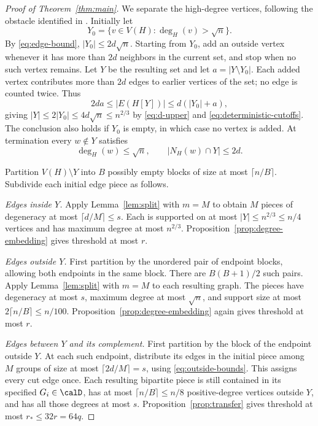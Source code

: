 \begin{proof}[Proof of Theorem~\ref{thm:main}]
We separate the high-degree vertices, following the obstacle
identified in \cite[Section~8]{AHPT26}. Initially let
\[
 Y_0=\{v\in V(H):\deg_H(v)>\sqrt n\}.
\]
By \eqref{eq:edge-bound}, $|Y_0|\leq2d\sqrt n$.
Starting from $Y_0$, add an outside vertex whenever it has more
than $2d$ neighbors in the current set, and stop when no such
vertex remains. Let $Y$ be the resulting set and let
$a=|Y\setminus Y_0|$. Each added vertex contributes more than
$2d$ edges to earlier vertices of the set; no edge is counted
twice. Thus
\[
 2da\leq|E(H[Y])|\leq d(|Y_0|+a),
\]
giving $|Y|\leq2|Y_0|\leq4d\sqrt n\leq n^{2/3}$ by
\eqref{eq:d-upper} and \eqref{eq:deterministic-cutoffs}.
The conclusion also holds if $Y_0$ is empty, in which case no
vertex is added. At termination every $w\notin Y$ satisfies
\begin{equation}\label{eq:outside-bounds}
 \deg_H(w)\leq\sqrt n,\qquad |N_H(w)\cap Y|\leq2d.
\end{equation}

Partition $V(H)\setminus Y$ into $B$ possibly empty blocks
of size at most $\lceil n/B\rceil$. Subdivide each initial
edge piece as follows.

\emph{Edges inside $Y$.}
Apply Lemma~\ref{lem:split} with $m=M$ to obtain $M$ pieces
of degeneracy at most $\lceil d/M\rceil\leq s$.
Each is supported on at most $|Y|\leq n^{2/3}\leq n/4$
vertices and has maximum degree at most $n^{2/3}$.
Proposition~\ref{prop:degree-embedding} gives threshold at most $r$.

\emph{Edges outside $Y$.}
First partition by the unordered pair of endpoint blocks,
allowing both endpoints in the same block. There are
$B(B+1)/2$ such pairs. Apply Lemma~\ref{lem:split} with
$m=M$ to each resulting graph. The pieces have degeneracy
at most $s$, maximum degree at most $\sqrt n$, and support
size at most $2\lceil n/B\rceil\leq n/100$.
Proposition~\ref{prop:degree-embedding} again gives threshold
at most $r$.

\emph{Edges between $Y$ and its complement.}
First partition by the block of the endpoint outside $Y$.
At each such endpoint, distribute its edges in the initial
piece among $M$ groups of size at most $\lceil2d/M\rceil=s$,
using \eqref{eq:outside-bounds}. This assigns every cut edge
once. Each resulting bipartite piece is still contained in its
specified $G_i\in\calD$, has at most $\lceil n/B\rceil\leq n/8$
positive-degree vertices outside $Y$, and has all those degrees
at most $s$. Proposition~\ref{prop:transfer} gives threshold
at most $r_*\leq32r=64q$.


\end{proof}
